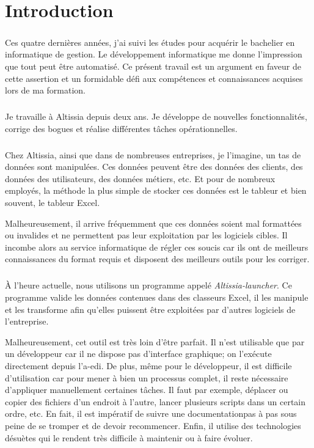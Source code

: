 \chapter{Introduction}
\label{ch:introduction}

\paragraph{}
Ces quatre dernières années, j'ai suivi les études pour acquérir le bachelier en informatique de gestion.
Le développement informatique me donne l'impression que tout peut être automatisé.
Ce présent travail est un argument en faveur de cette assertion et un formidable défi aux compétences et connaissances acquises lors de ma formation.

\paragraph{}
Je travaille à Altissia depuis deux ans.
Je développe de nouvelles fonctionnalités, corrige des bogues et réalise différentes tâches opérationnelles.

\paragraph{}
Chez Altissia, ainsi que dans de nombreuses entreprises, je l'imagine, un tas de données sont manipulées.
Ces données peuvent être des données des clients, des données des utilisateurs, des données métiers, etc.
Et pour de nombreux employés, la méthode la plus simple de stocker ces données est le tableur et bien souvent, le tableur Excel.

Malheureusement, il arrive fréquemment que ces données soient mal formattées ou invalides et ne permettent pas leur exploitation par les logiciels cibles.
Il incombe alors au service informatique de régler ces soucis car ils ont de meilleurs connaissances du format requis et disposent des meilleurs outils pour les corriger.

\paragraph{}
À l'heure actuelle, nous utilisons un programme appelé \textit{Altissia-launcher}.
Ce programme valide les données contenues dans des classeurs Excel, il les manipule et les transforme afin qu'elles puissent être exploitées par d'autres logiciels de l'entreprise.

Malheureusement, cet outil est très loin d'être parfait.
Il n'est utilisable que par un développeur car il ne dispose pas d'interface graphique; on l'exécute directement depuis l'\gls{a-edi}.
De plus, même pour le développeur, il est difficile d'utilisation car pour mener à bien un processus complet, il reste nécessaire d'appliquer manuellement certaines tâches.
Il faut par exemple, déplacer ou copier des fichiers d'un endroit à l'autre, lancer plusieurs scripts dans un certain ordre, etc.
En fait, il est impératif de suivre une documentation\fnmark pas à pas sous peine de se tromper et de devoir recommencer.
Enfin, il utilise des technologies désuètes qui le rendent très difficile à maintenir ou à faire évoluer.

